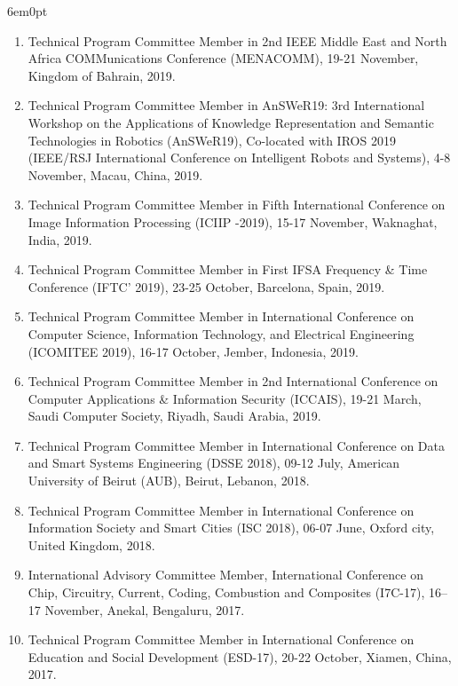 \documentclass[11pt,a4paper]{moderncv}
\begin{document}
\begin{adjustwidth}{6em}{0pt}
\begin{enumerate}
		\item Technical Program Committee Member in 2nd IEEE Middle East and North Africa COMMunications Conference (MENACOMM), 19-21 November, Kingdom of Bahrain, 2019.
		
		\item Technical Program Committee Member in AnSWeR19: 3rd International Workshop on the Applications of Knowledge Representation and Semantic Technologies in Robotics (AnSWeR19), Co-located with IROS 2019 (IEEE/RSJ International Conference on Intelligent Robots and Systems), 4-8 November, Macau, China, 2019.
		
		\item Technical Program Committee Member in Fifth International Conference on Image Information Processing (ICIIP -2019), 15-17 November, Waknaghat, India, 2019.
		
		\item Technical Program Committee Member in First IFSA Frequency \& Time Conference (IFTC' 2019), 23-25 October, Barcelona, Spain, 2019.
		
		\item Technical Program Committee Member in International Conference on Computer Science, Information Technology, and Electrical Engineering (ICOMITEE 2019), 16-17 October, Jember, Indonesia, 2019.
		
		\item Technical Program Committee Member in 2nd International Conference on Computer Applications \& Information Security (ICCAIS), 19-21 March, Saudi Computer Society, Riyadh, Saudi Arabia, 2019.
		
		\item Technical Program Committee Member in International Conference on Data and Smart Systems Engineering (DSSE 2018), 09-12 July, American University of Beirut (AUB), Beirut, Lebanon, 2018.
		
		\item Technical Program Committee Member in International Conference on Information Society and Smart Cities (ISC 2018), 06-07 June, Oxford city, United Kingdom, 2018.
		
		\item International Advisory Committee Member, International Conference on Chip, Circuitry, Current, Coding, Combustion and Composites (I7C-17), 16–17 November, Anekal, Bengaluru, 2017.
		
		\item Technical Program Committee Member in International Conference on Education and Social Development (ESD-17), 20-22 October, Xiamen, China, 2017.
		

\end{enumerate}
\end{adjustwidth}
\end{document}

